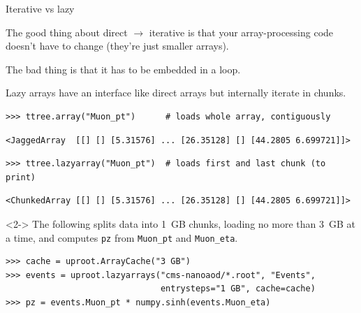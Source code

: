 \documentclass[aspectratio=169]{beamer}
\begin{document}
\begin{frame}[fragile]{Iterative vs lazy}
\large
\vspace{0.25 cm}

The good thing about direct $\to$ iterative is that your array-processing code doesn't have to change (they're just smaller arrays).

\vspace{0.25 cm}
The bad thing is that it has to be embedded in a loop.

\vspace{0.25 cm}
Lazy arrays have an interface like direct arrays but internally iterate in chunks.

\small
\begin{verbatim}
>>> ttree.array("Muon_pt")      # loads whole array, contiguously
\end{verbatim}

\vspace{-0.4 cm}
\color{darkblue}\begin{verbatim}
<JaggedArray  [[] [] [5.31576] ... [26.35128] [] [44.2805 6.699721]]>
\end{verbatim}
\color{black}

\vspace{-0.4 cm}
\begin{verbatim}
>>> ttree.lazyarray("Muon_pt")  # loads first and last chunk (to print)
\end{verbatim}

\vspace{-0.4 cm}
\color{darkblue}\begin{verbatim}
<ChunkedArray [[] [] [5.31576] ... [26.35128] [] [44.2805 6.699721]]>
\end{verbatim}
\color{black}\large

\begin{uncoverenv}<2->
The following splits data into 1~GB chunks, loading no more than 3~GB at a time, and computes \texttt{pz} from \texttt{Muon_pt} and \texttt{Muon_eta}.

\small
\begin{verbatim}
>>> cache = uproot.ArrayCache("3 GB")
>>> events = uproot.lazyarrays("cms-nanoaod/*.root", "Events",
                               entrysteps="1 GB", cache=cache)
>>> pz = events.Muon_pt * numpy.sinh(events.Muon_eta)
\end{verbatim}
\end{uncoverenv}
\end{frame}

\end{document}
